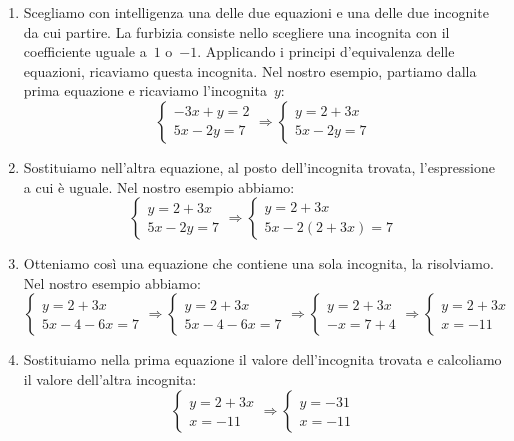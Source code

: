 \begin{enumerate}
 \item Scegliamo con intelligenza una delle due equazioni e una
delle due incognite da cui partire. 
La furbizia consiste nello scegliere una incognita con il coefficiente uguale 
a~$1$ o~$-1$.
Applicando i principi d'equivalenza delle equazioni, ricaviamo questa
incognita.
Nel nostro esempio, partiamo dalla prima equazione e ricaviamo
l'incognita~$y$:
\[\left\{\begin{array}{l}
     -3x+y=2\\
     5x-2y=7
    \end{array}
\right.
\Rightarrow
\left\{\begin{array}{l}y=2+3x \\
         5x-2y=7
\end{array}\right.\]

 \item Sostituiamo nell'altra equazione, al posto
dell'incognita trovata, l'espressione a cui è uguale. 
Nel nostro esempio abbiamo:
\[\left\{\begin{array}{l}
     y=2+3x\\
     5x-2y=7
    \end{array}
\right.
\Rightarrow
\left\{\begin{array}{l}y=2+3x \\
         5x-2(2+3x)=7
\end{array}\right.\]

 \item Otteniamo così una equazione che contiene una sola 
incognita, la risolviamo.
Nel nostro esempio abbiamo:
\[\left\{\begin{array}{l}y=2+3x\\
5x-4-6x=7\end{array}\right.\Rightarrow
\left\{\begin{array}{l}
         y=2+3x\\
         5x-4-6x=7
        \end{array}\right.\Rightarrow
 \left\{\begin{array}{l}y=2+3x\\
         -x=7+4
        \end{array}\right.\Rightarrow
 \left\{\begin{array}{l}y=2+3x\\
         x=-11
  \end{array}\right.\]

 \item Sostituiamo nella prima equazione il valore dell'incognita trovata e 
calcoliamo il valore dell'altra incognita:
\[ \left\{\begin{array}{l}y=2+3x\\
         x=-11
  \end{array}\right.\Rightarrow
  \left\{\begin{array}{l}
         y=-31\\
         x=-11
  \end{array}\right.\]


\end{enumerate}
